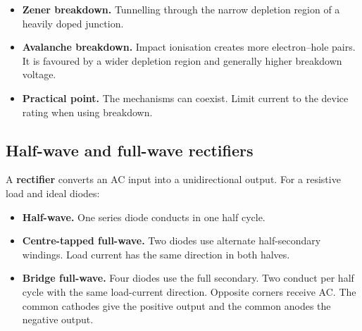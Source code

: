 \documentclass[12pt,a4paper]{article}
\begin{document}
\begin{tcolorbox}[tikzbox,title={Diode current--voltage characteristic (schematic)},unbreakable]
\centering
{}
\end{tcolorbox}

\begin{itemize}[leftmargin=*, itemsep=3pt, topsep=4pt]
  \item \textbf{Zener breakdown.} Tunnelling through the narrow depletion region of a heavily doped junction.
  \item \textbf{Avalanche breakdown.} Impact ionisation creates more electron--hole pairs. It is favoured by a wider depletion region and generally higher breakdown voltage.
  \item \textbf{Practical point.} The mechanisms can coexist. Limit current to the device rating when using breakdown.
\end{itemize}

\subsection{Half-wave and full-wave rectifiers}
A \textbf{rectifier} converts an AC input into a unidirectional output. For a resistive load and ideal diodes:
\begin{itemize}[leftmargin=*, itemsep=3pt, topsep=4pt]
  \item \textbf{Half-wave.} One series diode conducts in one half cycle.
  \item \textbf{Centre-tapped full-wave.} Two diodes use alternate half-secondary windings. Load current has the same direction in both halves.
  \item \textbf{Bridge full-wave.} Four diodes use the full secondary. Two conduct per half cycle with the same load-current direction. Opposite corners receive AC. The common cathodes give the positive output and the common anodes the negative output.
\end{itemize}
\end{document}
